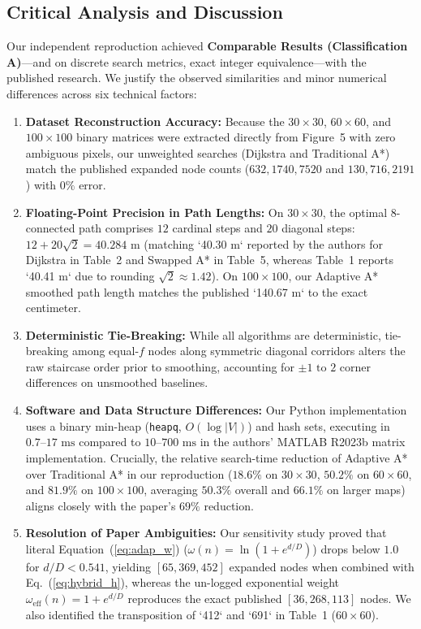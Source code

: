 \documentclass[conference]{IEEEtran}
\begin{document}
\begin{enumerate}
\section{Critical Analysis and Discussion}
Our independent reproduction achieved \textbf{Comparable Results (Classification A)}—and on discrete search metrics, exact integer equivalence—with the published research. We justify the observed similarities and minor numerical differences across six technical factors:
\begin{enumerate}
    \item \textbf{Dataset Reconstruction Accuracy:} Because the $30 \times 30$, $60 \times 60$, and $100 \times 100$ binary matrices were extracted directly from Figure~5 with zero ambiguous pixels, our unweighted searches (Dijkstra and Traditional A*) match the published expanded node counts ($632, 1740, 7520$ and $130, 716, 2191$) with $0\%$ error.
    \item \textbf{Floating-Point Precision in Path Lengths:} On $30 \times 30$, the optimal 8-connected path comprises $12$ cardinal steps and $20$ diagonal steps: $12 + 20\sqrt{2} = 40.284\text{ m}$ (matching `40.30 m` reported by the authors for Dijkstra in Table~2 and Swapped A* in Table~5, whereas Table~1 reports `40.41 m` due to rounding $\sqrt{2} \approx 1.42$). On $100 \times 100$, our Adaptive A* smoothed path length matches the published `140.67 m` to the exact centimeter.
    \item \textbf{Deterministic Tie-Breaking:} While all algorithms are deterministic, tie-breaking among equal-$f$ nodes along symmetric diagonal corridors alters the raw staircase order prior to smoothing, accounting for $\pm 1\text{ to }2$ corner differences on unsmoothed baselines.
    \item \textbf{Software and Data Structure Differences:} Our Python implementation uses a binary min-heap (\texttt{heapq}, $O(\log |V|)$) and hash sets, executing in $0.7\text{--}17\text{ ms}$ compared to $10\text{--}700\text{ ms}$ in the authors' MATLAB R2023b matrix implementation. Crucially, the relative search-time reduction of Adaptive A* over Traditional A* in our reproduction ($18.6\%$ on $30\times 30$, $50.2\%$ on $60\times 60$, and $81.9\%$ on $100\times 100$, averaging $50.3\%$ overall and $66.1\%$ on larger maps) aligns closely with the paper's $69\%$ reduction.
    \item \textbf{Resolution of Paper Ambiguities:} Our sensitivity study proved that literal Equation~(\ref{eq:adap_w}) ($\omega(n)=\ln(1+e^{d/D})$) drops below $1.0$ for $d/D < 0.541$, yielding $[65, 369, 452]$ expanded nodes when combined with Eq.~(\ref{eq:hybrid_h}), whereas the un-logged exponential weight $\omega_{\text{eff}}(n)=1+e^{d/D}$ reproduces the exact published $[36, 268, 113]$ nodes. We also identified the transposition of `412` and `691` in Table~1 ($60 \times 60$).

\end{enumerate}
\end{enumerate}
\end{document}

